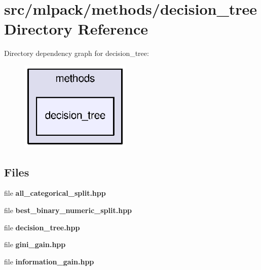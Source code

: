 \section{src/mlpack/methods/decision\+\_\+tree Directory Reference}
\label{dir_f295b20b1dd4e5e0a64437251c55c9ac}
Directory dependency graph for decision\+\_\+tree\+:
\nopagebreak
\begin{figure}[H]
\begin{center}
\leavevmode
\includegraphics[width=150pt]{dir_f295b20b1dd4e5e0a64437251c55c9ac_dep}
\end{center}
\end{figure}
\subsection*{Files}
\begin{DoxyCompactItemize}
\item 
file {\bf all\+\_\+categorical\+\_\+split.\+hpp}
\item 
file {\bf best\+\_\+binary\+\_\+numeric\+\_\+split.\+hpp}
\item 
file {\bf decision\+\_\+tree.\+hpp}
\item 
file {\bf gini\+\_\+gain.\+hpp}
\item 
file {\bf information\+\_\+gain.\+hpp}
\end{DoxyCompactItemize}
